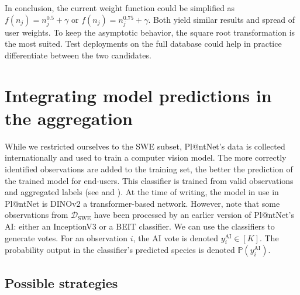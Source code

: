 In conclusion, the current weight function could be simplified as $f(n_j)=n_j^{0.5}+\gamma$ or $f(n_j)=n_j^{0.75}+\gamma$.
Both yield similar results and spread of user weights.
To keep the asymptotic behavior, the square root transformation is the most suited.
Test deployments on the full database could help in practice differentiate between the two candidates.

\section{Integrating model predictions in the aggregation}

While we restricted ourselves to the SWE subset, Pl@ntNet's data is collected internationally and used to train a computer vision model.
The more correctly identified observations are added to the training set, the better the prediction of the trained model for end-users.
This classifier is trained from valid observations and aggregated labels (see  and ).
At the time of writing, the model in use in Pl@ntNet is DINOv2 \citep{oquab2024dinov2} a transformer-based network.
However, note that some observations from $\mathcal{D}_{\text{SWE}}$ have been processed by an earlier version of Pl@ntNet's AI: either an InceptionV3 \citep{szegedy2015rethinking} or a BEIT \citep{bao2021beit} classifier.
We can use the classifiers to generate votes.
For an observation $i$, the AI vote is denoted $y_i^{\text{AI}}\in[K]$. The probability output in the classifier's predicted species is denoted $\mathbb{P}(y_i^{\text{AI}})$.

\subsection{Possible strategies}
\label{sub:strats_ai}

